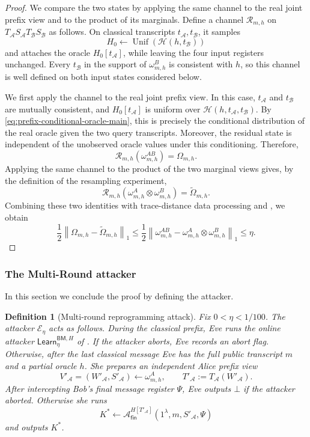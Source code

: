 \documentclass[11pt]{article}
\newtheorem{definition}[definition]{Definition}
\newcommand{\cA}{\mathcal{A}}
\newcommand{\cB}{\mathcal{B}}
\newcommand{\cE}{\mathcal{E}}
\newcommand{\cH}{\mathcal{H}}
\newcommand{\Unif}{\operatorname{Unif}}
\newcommand{\Learn}{\mathsf{Learn}}
\begin{document}
\begin{proof}
We compare the two states by applying the same channel to the real joint
prefix view and to the product of its marginals.  Define a channel
$\mathcal R_{m,h}$ on $T_{\cA}S_{\cA}T_{\cB}S_{\cB}$ as follows.  On
classical transcripts $t_{\cA},t_{\cB}$, it samples
\[
  H_0\leftarrow\Unif(\cH(h,t_{\cB}))
\]
and attaches the oracle $H_0[t_{\cA}]$, while leaving the four input
registers unchanged.  Every $t_{\cB}$ in the support of
$\omega^B_{m,h}$ is consistent with $h$, so this channel is well defined on
both input states considered below.

We first apply the channel to the real joint prefix view.  In this case,
$t_{\cA}$ and $t_{\cB}$ are mutually consistent, and
$H_0[t_{\cA}]$ is uniform over $\cH(h,t_{\cA},t_{\cB})$.  By
\eqref{eq:prefix-conditional-oracle-main}, this is precisely the conditional
distribution of the real oracle given the two query transcripts.  Moreover,
the residual state is independent of the unobserved oracle values under this
conditioning.  Therefore,
\[
  \mathcal R_{m,h}(\omega^{AB}_{m,h})=\Omega_{m,h}.
\]
Applying the same channel to the product of the two marginal views gives,
by the definition of the resampling experiment,
\[
  \mathcal R_{m,h}
  (\omega^A_{m,h}\otimes\omega^B_{m,h})
  =\widetilde\Omega_{m,h}.
\]
Combining these two identities with trace-distance data processing and
, we obtain
\[
  \frac12\left\|
    \Omega_{m,h}-\widetilde\Omega_{m,h}
  \right\|_1
  \le
  \frac12\left\|
    \omega^{AB}_{m,h}
    -\omega^A_{m,h}\otimes\omega^B_{m,h}
  \right\|_1
  \le\eta.
\]
\end{proof}

\subsubsection{The Multi-Round attacker}

In this section we conclude the proof by defining the attacker.

\begin{definition}[Multi-round reprogramming attack]
\label{def:multi-eve}
Fix \(0<\eta<1/100\). The attacker \(\cE_\eta\) acts as follows. During the
classical prefix, Eve runs the online
attacker \(\Learn^{\mathsf{BM},H}_\eta\) of
. If the attacker aborts, Eve records an
abort flag. Otherwise, after the last classical message Eve has the full
public transcript \(m\) and a partial oracle \(h\). She prepares an
independent Alice prefix view
\[
  V'_{\cA}=(W'_{\cA},S'_{\cA})
  \leftarrow\omega^A_{m,h},
  \qquad
  T'_{\cA}:=T_{\cA}(W'_{\cA}).
\]
After intercepting Bob's final message register \(\Psi\), Eve outputs
\(\bot\) if the attacker aborted. Otherwise she runs
\[
  K^*
  \leftarrow
  \cA_{\mathsf{fin}}^{H[T'_{\cA}]}
  (1^\lambda,m,S'_{\cA},\Psi)
\]
and outputs \(K^*\).
\end{definition}
\end{document}
